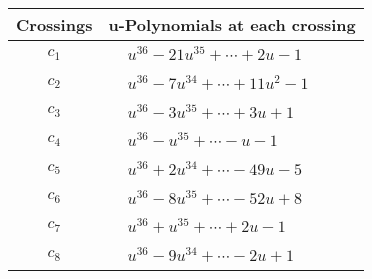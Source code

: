 \documentclass[1p]{elsarticle_modified}
\theoremstyle{definition}
\begin{document}
\begin{tabular}{m{50pt}|m{274pt}}
Crossings & \hspace{64pt}u-Polynomials at each crossing \\
\hline $$\begin{aligned}c_{1}\end{aligned}$$&$\begin{aligned}
&u^{36}-21 u^{35}+\cdots+2 u-1
\end{aligned}$\\
\hline $$\begin{aligned}c_{2}\end{aligned}$$&$\begin{aligned}
&u^{36}-7 u^{34}+\cdots+11 u^2-1
\end{aligned}$\\
\hline $$\begin{aligned}c_{3}\end{aligned}$$&$\begin{aligned}
&u^{36}-3 u^{35}+\cdots+3 u+1
\end{aligned}$\\
\hline $$\begin{aligned}c_{4}\end{aligned}$$&$\begin{aligned}
&u^{36}- u^{35}+\cdots- u-1
\end{aligned}$\\
\hline $$\begin{aligned}c_{5}\end{aligned}$$&$\begin{aligned}
&u^{36}+2 u^{34}+\cdots-49 u-5
\end{aligned}$\\
\hline $$\begin{aligned}c_{6}\end{aligned}$$&$\begin{aligned}
&u^{36}-8 u^{35}+\cdots-52 u+8
\end{aligned}$\\
\hline $$\begin{aligned}c_{7}\end{aligned}$$&$\begin{aligned}
&u^{36}+u^{35}+\cdots+2 u-1
\end{aligned}$\\
\hline $$\begin{aligned}c_{8}\end{aligned}$$&$\begin{aligned}
&u^{36}-9 u^{34}+\cdots-2 u+1
\end{aligned}$\\

\end{tabular}
\end{document}
